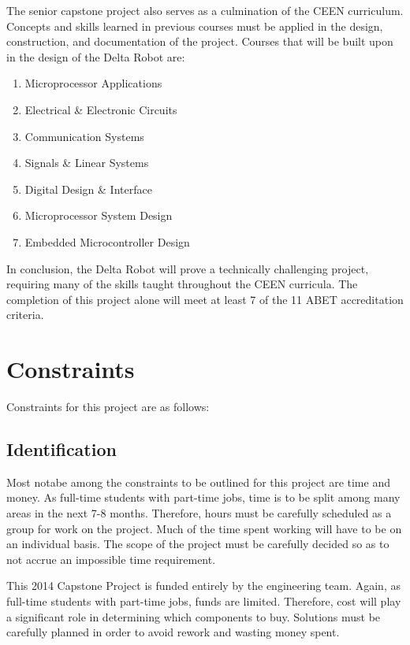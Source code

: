 \documentclass[11pt]{report}
\begin{document}
\par The senior capstone project also serves as a culmination of the CEEN curriculum. Concepts and skills learned in previous courses must be applied in the design, construction, and documentation of the project. Courses that will be built upon in the design of the Delta Robot are:
\begin{enumerate} \parskip2pt
	\item Microprocessor Applications
	\item Electrical \& Electronic Circuits
	\item Communication Systems
	\item Signals \& Linear Systems
	\item Digital Design \& Interface
	\item Microprocessor System Design
	\item Embedded Microcontroller Design
\end{enumerate}

\par In conclusion, the Delta Robot will prove a technically challenging project, requiring many of the skills taught throughout the CEEN curricula. The completion of this project alone will meet at least 7 of the 11 ABET accreditation criteria.

\section{Constraints}	
Constraints for this project are as follows:

\subsection{ Identification}
\par Most notabe among the constraints to be outlined for this project are time and money. As full-time students with part-time jobs, time is to be split among many areas in the next 7-8 months. Therefore, hours must be carefully scheduled as a group for work on the project. Much of the time spent working will have to be on an individual basis. The scope of the project must be carefully decided so as to not accrue an impossible time requirement. 
\par This 2014 Capstone Project is funded entirely by the engineering team. Again, as full-time students with part-time jobs, funds are limited. Therefore, cost will play a significant role in determining which components to buy. Solutions must be carefully planned in order to avoid rework and wasting money spent.
\end{document}
